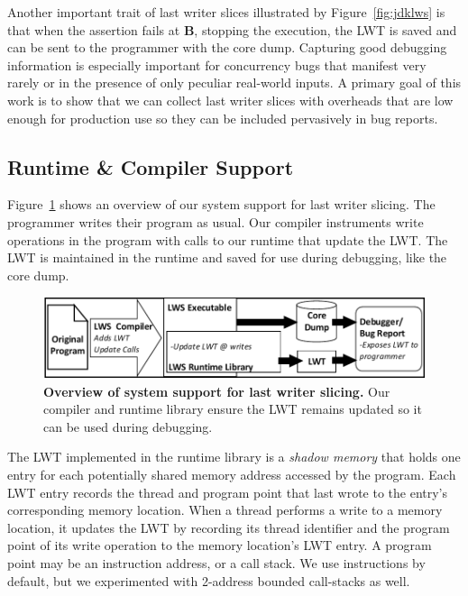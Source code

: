 \documentclass[preprint,9pt]{sigplanconf}
\newcommand{\lwt}{LWT\xspace}
\begin{document}
Another important trait of last writer slices illustrated by
Figure~\ref{fig:jdklws} is that when the assertion fails at {\bf B}, stopping
the execution, the \lwt is saved and can be sent to the programmer with the
core dump.  Capturing good debugging information is especially important for
concurrency bugs that manifest very rarely or in the presence of only peculiar
real-world inputs.  A primary goal of this work is to show that we can collect
last writer slices with overheads that are low enough for production use so
they can be included pervasively in bug reports.


\subsection{Runtime \& Compiler Support}

Figure~\ref{fig:lwsoverview} shows an overview of our system support for last
writer slicing.  The programmer writes their program as usual. Our compiler
instruments write operations in the program with calls to our runtime that
update the \lwt.  The \lwt is maintained in the runtime and saved for use
during debugging, like the core dump. 

\begin{figure}[h]
\centering
\includegraphics[width=.9\columnwidth]{figs/LWS_Overview.pdf}
\caption{\label{fig:lwsoverview}{\bf Overview of system support for last writer slicing.} Our compiler and runtime library ensure the \lwt remains updated so it can be used during debugging.}
\end{figure}

The \lwt implemented in the runtime library is a {\em shadow memory} that
holds one entry for each potentially shared memory address accessed by the
program.  Each \lwt entry records the thread and program point that last wrote
to the entry's corresponding memory location.  When a thread performs a write
to a memory location, it updates the \lwt by recording its thread identifier
and the program point of its write operation to the memory location's \lwt
entry.  A program point may be an instruction address, or a call stack.  We use
instructions by default, but we experimented with 2-address bounded call-stacks
as well.   
\end{document}
